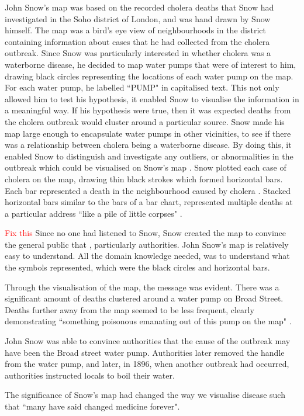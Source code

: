 \documentclass[12pt]{article}
\newcommand\todo[1]{\textcolor{red}{#1}}
\begin{document}
John Snow's map was based on the recorded cholera deaths that Snow had investigated in the Soho district of London, and was hand drawn by Snow himself. The map was a bird's eye view of neighbourhoods in the district containing information about cases that he had collected from the cholera outbreak. Since Snow was particularly interested in whether cholera was a waterborne disease, he decided to map water pumps that were of interest to him, drawing black circles representing the locations of each water pump on the map. For each water pump, he labelled ``PUMP" in capitalised text. This not only allowed him to test his hypothesis, it enabled Snow to visualise the information in a meaningful way. If his hypothesis were true, then it was expected deaths from the cholera outbreak would cluster around a particular source. Snow made his map large enough to encapsulate water pumps in other vicinities, to see if there was a relationship between cholera being a waterborne disease. By doing this, it enabled Snow to distinguish and investigate any outliers, or abnormalities in the outbreak which could be visualised on Snow's map \cite{blog}. Snow plotted each case of cholera on the map, drawing thin black strokes which formed horizontal bars. Each bar represented a death in the neighbourhood caused by cholera \cite{tedtalk}. Stacked horizontal bars similar to the bars of a bar chart, represented multiple deaths at a particular address ``like a pile of little corpses" \cite{blog}.

\todo{Fix this} Since no one had listened to Snow, Snow created the map to convince the general public that , particularly authorities. John Snow's map is relatively easy to understand. All the domain knowledge needed, was to understand what the symbols represented, which were the black circles and horizontal bars.

Through the visualisation of the map, the message was evident. There was a significant amount of deaths clustered around a water pump on Broad Street. Deaths further away from the map seemed to be less frequent, clearly demonstrating ``something poisonous emanating out of this pump on the map" \cite{blog}.

John Snow was able to convince authorities that the cause of the outbreak may have been the Broad street water pump. Authorities later removed the handle from the water pump, and later, in 1896, when another outbreak had occurred, authorities instructed locals to boil their water. 

The significance of Snow's map had changed the way we visualise disease such that ``many have said changed medicine forever". \cite{heros}
\end{document}
